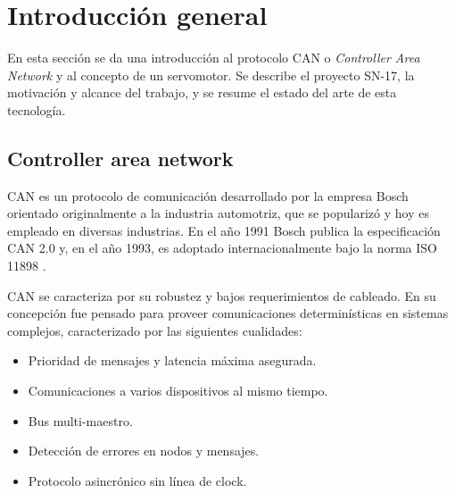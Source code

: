 
\chapter{Introducción general} %

\label{Chapter1} %
\label{IntroGeneral}


\newcommand{\keyword}[1]{\textbf{#1}}
\newcommand{\tabhead}[1]{\textbf{#1}}
\newcommand{\code}[1]{\texttt{#1}}
\newcommand{\file}[1]{\texttt{\bfseries#1}}
\newcommand{\option}[1]{\texttt{\itshape#1}}
\newcommand{\grados}{$^{\circ}$}



En esta sección se da una introducción al protocolo CAN o \textit{Controller Area Network}\citep{web_cia_can} y al concepto de un servomotor. Se describe el proyecto SN-17, la motivación y alcance del trabajo, y se resume el estado del arte de esta tecnología.

\section{Controller area network}

CAN es un protocolo de comunicación desarrollado por la empresa Bosch \citep{can_basics_microchip} orientado originalmente a la industria automotriz, que se popularizó y hoy es empleado en diversas industrias. En el año 1991 Bosch publica la especificación CAN 2.0 y, en el año 1993, es adoptado internacionalmente bajo la norma ISO 11898 \citep{web_ISO_CAN}.

CAN se caracteriza por su robustez y bajos requerimientos de cableado. En su concepción fue pensado para proveer comunicaciones determinísticas en sistemas complejos, caracterizado por las siguientes cualidades\citep{Understanding_CAN}:
\begin{itemize}
	\item Prioridad de mensajes y latencia máxima asegurada.
	\item Comunicaciones a varios dispositivos al mismo tiempo.	
	\item Bus multi-maestro.
	\item Detección de errores en nodos y mensajes.
	\item Protocolo asincrónico sin línea de clock.
\end{itemize}

